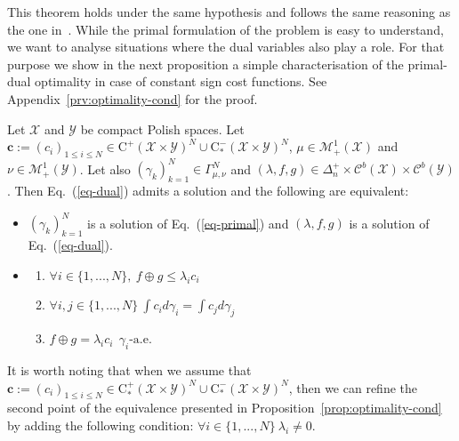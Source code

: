 This theorem holds under the same hypothesis and follows the same reasoning as the one in~\citep[Theorem 1.3]{villani2003topics}. While the primal formulation of the problem is easy to understand, we want to analyse situations where the dual variables also play a role. For that purpose we
show in the next proposition a simple characterisation
of the primal-dual optimality in case of constant sign
cost functions.  See Appendix~\ref{prv:optimality-cond} for the proof.
\begin{prop}
\label{prop:optimality-cond}
Let $\mathcal{X}$ and $\mathcal{Y}$ be compact Polish spaces. Let $\mathbf{c}:=(c_i)_{1\leq i\leq N}\in\mathrm{C}^+(\mathcal{X}\times\mathcal{Y})^N\cup\mathrm{C}^-_{*}(\mathcal{X}\times\mathcal{Y})^N$, $\mu\in\mathcal{M}^1_+(\mathcal{X})$ and  $\nu\in\mathcal{M}^1_+(\mathcal{Y})$. Let also $(\gamma_k)_{k=1}^N\in\Gamma^N_{\mu,\nu}$ and $(\lambda,f,g)\in\Delta_n^{+}\times\mathcal{C}^b(\mathcal{X})\times\mathcal{C}^b(\mathcal{Y})$. Then Eq.~(\ref{eq-dual}) admits a solution and the following are equivalent:
\begin{itemize}
    \item $(\gamma_k)_{k=1}^N$ is a solution of Eq.~(\ref{eq-primal}) and $(\lambda,f,g)$ is a solution of Eq.~(\ref{eq-dual}).
    \item \begin{enumerate}
        \item $\forall i\in\{1,...,N\},~ f\oplus g\leq\lambda_i c_i$
        \item $\forall i,j\in\{1,...,N\}~\int c_i d\gamma_i=\int c_j d\gamma_j$
        \item $f \oplus g= \lambda_i c_i ~~\gamma_{i}\text{-a.e.}$
    \end{enumerate}
\end{itemize}
\end{prop}
\begin{rmq}
\label{rk:lambdanonzero}
It is worth noting that when we assume that $\mathbf{c}:=(c_i)_{1\leq i\leq N}\in\mathrm{C}^+_{*}(\mathcal{X}\times\mathcal{Y})^N\cup\mathrm{C}^-_{*}(\mathcal{X}\times\mathcal{Y})^N$, then we can refine the second point of the equivalence presented in Proposition~\ref{prop:optimality-cond} by adding the following condition: $\forall i\in\{1,...,N\}~\lambda_i\neq 0$.
\end{rmq}

